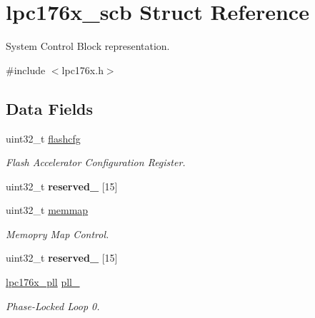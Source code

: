 \hypertarget{structlpc176x__scb}{}\section{lpc176x\+\_\+scb Struct Reference}
\label{structlpc176x__scb}


System Control Block representation.  




{\ttfamily \#include $<$lpc176x.\+h$>$}

\subsection*{Data Fields}
\begin{DoxyCompactItemize}
\item 
\mbox{\label{structlpc176x__scb_a080c5bb9301c82b1a6010db6285e0ecb}} 
uint32\+\_\+t \mbox{\hyperlink{structlpc176x__scb_a080c5bb9301c82b1a6010db6285e0ecb}{flashcfg}}
\begin{DoxyCompactList}\small\item\em Flash Accelerator Configuration Register. \end{DoxyCompactList}\item 
\mbox{\label{structlpc176x__scb_ac2555ce9f3fa390c9d354599cbf794a6}} 
uint32\+\_\+t {\bfseries reserved\+\_} \mbox{[}15\mbox{]}
\item 
\mbox{\label{structlpc176x__scb_a671d84b31a4aba66213de08239c429ef}} 
uint32\+\_\+t \mbox{\hyperlink{structlpc176x__scb_a671d84b31a4aba66213de08239c429ef}{memmap}}
\begin{DoxyCompactList}\small\item\em Memopry Map Control. \end{DoxyCompactList}\item 
\mbox{\label{structlpc176x__scb_a91535b00aed61d1d5eab9f4847144fc3}} 
uint32\+\_\+t {\bfseries reserved\+\_} \mbox{[}15\mbox{]}
\item 
\mbox{\label{structlpc176x__scb_a23bc724a1fe165a98dfd4e97b28793fa}} 
\mbox{\hyperlink{structlpc176x__pll}{lpc176x\+\_\+pll}} \mbox{\hyperlink{structlpc176x__scb_a23bc724a1fe165a98dfd4e97b28793fa}{pll\+\_}}
\begin{DoxyCompactList}\small\item\em Phase-\/\+Locked Loop 0. \end{DoxyCompactList}\item 

\end{DoxyCompactItemize}
